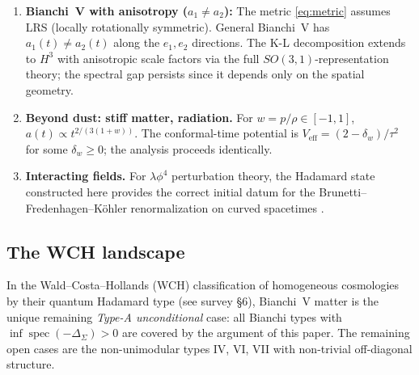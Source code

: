 \documentclass[12pt,letterpaper]{article}
\DeclareMathOperator{\spec}{spec}
\begin{document}
\begin{enumerate}
  \item \textbf{Bianchi~V with anisotropy ($a_1 \neq a_2$):}
    The metric \eqref{eq:metric} assumes LRS (locally rotationally symmetric).
    General Bianchi~V has $a_1(t) \neq a_2(t)$ along the $e_1,e_2$ directions.
    The K-L decomposition extends to $H^3$ with anisotropic scale factors
    via the full $SO(3,1)$-representation theory;
    the spectral gap persists since it depends only on the spatial geometry.
  \item \textbf{Beyond dust: stiff matter, radiation.}
    For $w = p/\rho \in [-1,1]$, $a(t) \propto t^{2/(3(1+w))}$.
    The conformal-time potential is $V_{\mathrm{eff}} = (2 - \delta_w)/\tau^2$
    for some $\delta_w \geq 0$; the analysis proceeds identically.
  \item \textbf{Interacting fields.}
    For $\lambda\phi^4$ perturbation theory, the Hadamard state
    constructed here provides the correct initial datum for the
    Brunetti--Fredenhagen--K\"{o}hler renormalization on curved spacetimes
    \cite{BFK95}.
\end{enumerate}

\subsection{The WCH landscape}

In the Wald--Costa--Hollands (WCH) classification of
homogeneous cosmologies by their quantum Hadamard type
(see survey \cite{BN23} \S6),
Bianchi~V matter is the unique remaining \emph{Type-A unconditional} case:
all Bianchi types with $\inf\spec(-\Delta_\Sigma) > 0$ are covered
by the argument of this paper.
The remaining open cases are the non-unimodular types IV, VI, VII with
non-trivial off-diagonal structure.

\end{document}
